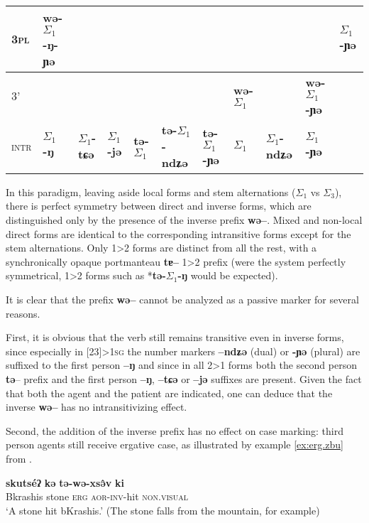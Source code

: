 \documentclass[twoside,a4paper,11pt]{article}
\newcommand{\ipa}[1]{{\phon\textbf{#1}}}
\newcommand{\grise}[1]{\cellcolor{lightgray}\textbf{#1}}
\newcommand{\ra}{$\Sigma_1$}
\newcommand{\rc}{$\Sigma_3$}
\begin{document}
\begin{table}[h]
{\begin{tabular}{l|l|l|l|l|l|l|l|l|l|l|}
\cline{2-2}	
\cline{11-11}
\textsc{3pl} &  \cellcolor[wave]{500}	\ipa{wə-\ra{}-ŋ-ɲə} & 	\cellcolor[wave]{500} & \cellcolor[wave]{500} & 	\cellcolor[wave]{500} & 	\cellcolor[wave]{500} & 	\cellcolor[wave]{500} & \multicolumn{3}{c|}{\grise{}} &	\ipa{\ra{}-ɲə} \\ 	
\hline
\textsc{3'} & 	\multicolumn{6}{c|}{\grise{}} &\cellcolor[wave]{500}	\ipa{wə-\ra{}} & 	\cellcolor[wave]{500}\ipa{wə-\ra{}-ndʑə} & \cellcolor[wave]{500}	\ipa{wə-\ra{}-ɲə} & 	\grise{} \\	
	\hline	\hline
\textsc{intr}&\ipa{\ra{}-ŋ}&\ipa{\ra{}-tɕə}&\ipa{\ra{}-jə}&\ipa{tə-\ra{}}&\ipa{tə-\ra{}-ndʑə}&\ipa{tə-\ra{}-ɲə}&\ipa{\ra{}}&\ipa{\ra{}-ndʑə} &\ipa{\ra{}-ɲə}& 	\grise{} \\	
	\hline
\end{tabular}}
\end{table}

In this paradigm, leaving aside local forms and stem alternations (\ra{} vs \rc{}), there is perfect symmetry between direct and inverse forms, which are distinguished only by the presence of the inverse prefix \ipa{wə--}. Mixed and non-local direct forms are identical to the corresponding intransitive forms except for the stem alternations. Only 1>2 forms are distinct from all the rest, with a synchronically opaque portmanteau \ipa{tɐ--} 1>2 prefix (were the system perfectly symmetrical, 1>2 forms such as *\ipa{tə-\ra{}-ŋ} would be expected).

It is clear that the prefix \ipa{wə--} cannot be analyzed as a passive marker for several reasons. 

First, it is obvious that the verb still remains transitive even in inverse forms, since especially in [23]>\textsc{1sg} the number markers \ipa{--ndʑə} (dual) or \ipa{-ɲə} (plural) are suffixed to the first person \ipa{--ŋ} and since in all 2>1 forms both the second person \ipa{tə}-- prefix and the first person \ipa{--ŋ}, \ipa{--tɕə} or \ipa{--jə} suffixes are present. Given the fact that both the agent and the patient are indicated, one can deduce that the inverse \ipa{wə--} has no intransitivizing effect.

Second, the addition of the inverse prefix has no effect on case marking: third person agents still receive ergative case, as illustrated by example \ref{ex:erg.zbu} from  \citet{gongxun12}.

\begin{exe}
\ex \label{ex:erg.zbu}
\gll \ipa{tʂɐɕî}  	\ipa{skutséʔ}  \ipa{kə}  \ipa{tə-wə-xsə̂v}  \ipa{ki}   \\
Bkrashis stone \textsc{erg} \textsc{aor-inv}-hit \textsc{non.visual} \\
\glt `A stone hit bKrashis.’ (The stone falls from the mountain, for example)
\end{exe}
\end{document}
